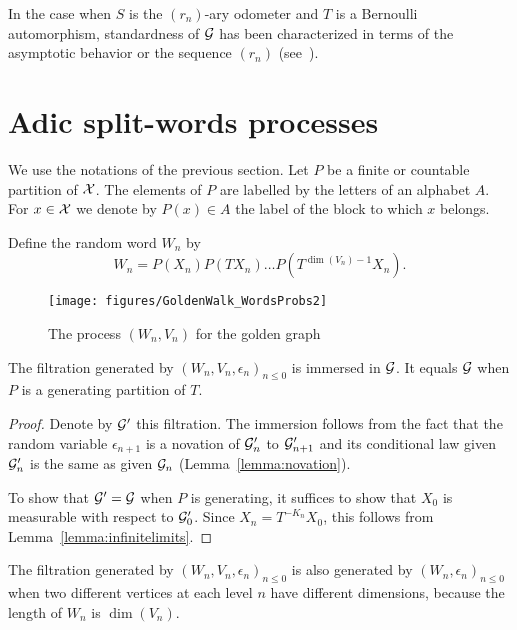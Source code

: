\documentclass[12pt,a4paper]{article}
\begin{document}
In the case when $S$ is the $(r_n)$-ary odometer and 
$T$ is a Bernoulli automorphism, standardness of $\mathcal{G}$ 
has been characterized in terms of the asymptotic behavior or the 
sequence $(r_n)$ (see~\cite{Ceil, LauXLIII, LauXLV}).





\section{Adic split-words processes}\label{sec:adicsplitwords}

We use the notations of the previous section. 
Let $P$ be a finite or countable partition of $\mathcal{X}$. 
The elements of $P$ are labelled by the letters of an alphabet $A$. 
For $x \in \mathcal{X}$ we denote by $P(x) \in A$ the label of the block to which $x$ belongs.

Define the random word $W_n$ by 
$$
W_n = P(X_n)P(TX_n)\ldots P(T^{\dim(V_n)-1}X_n).
$$

\begin{figure}[!h]
\centering
	\texttt{[image: figures/GoldenWalk\_WordsProbs2]}
\caption{The process $(W_n, V_n)$ for the golden graph}
\end{figure}

\begin{lemma}
The filtration generated by ${(W_n,V_n,\epsilon_n)}_{n \leq 0}$  
is immersed in $\mathcal{G}$. 
It equals $\mathcal{G}$ when $P$ is a generating partition of $T$.
\end{lemma}

\begin{proof}
Denote by $\mathcal{G}'$ this filtration. The immersion follows from the fact 
that the random variable $\epsilon_{n+1}$ is 
a novation of $\mathcal{G}'_n$ to $\mathcal{G}'_{n+1}$ and its conditional law given 
$\mathcal{G}'_n$ is the same as given $\mathcal{G}_n$ (Lemma~\ref{lemma:novation}).

To show that $\mathcal{G}'=\mathcal{G}$ when $P$ is generating, it suffices to show 
that $X_0$ is measurable with respect to $\mathcal{G}'_0$. 
Since $X_n=T^{-K_n}X_0$, this follows from Lemma~\ref{lemma:infinitelimits}. 
\end{proof}

The filtration generated by ${(W_n,V_n,\epsilon_n)}_{n \leq 0}$ 
is also generated by ${(W_n,\epsilon_n)}_{n \leq 0}$ when 
two different vertices at each level $n$ have different dimensions, 
because the length of $W_n$ is $\dim(V_n)$. 
\end{document}
